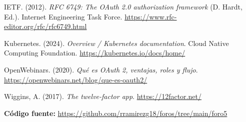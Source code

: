 \documentclass[12pt,letterpaper]{article}
\begin{document}
\vspace{4pt}
\hangindent=1cm \noindent IETF. (2012). \textit{RFC 6749: The OAuth 2.0 authorization framework} (D. Hardt, Ed.). Internet Engineering Task Force. \url{https://www.rfc-editor.org/rfc/rfc6749.html}

\vspace{4pt}
\hangindent=1cm \noindent Kubernetes. (2024). \textit{Overview / Kubernetes documentation}. Cloud Native Computing Foundation. \url{https://kubernetes.io/docs/home/}

\vspace{4pt}
\hangindent=1cm \noindent OpenWebinars. (2020). \textit{Qué es OAuth 2, ventajas, roles y flujo}. \url{https://openwebinars.net/blog/que-es-oauth2/}

\vspace{4pt}
\hangindent=1cm \noindent Wiggins, A. (2017). \textit{The twelve-factor app}. \url{https://12factor.net/}

\vspace{14pt}
\noindent\small \textbf{Código fuente:} \url{https://github.com/rramirezg18/foros/tree/main/foro5}
\end{document}

